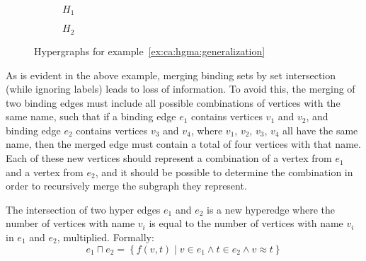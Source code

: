 \documentclass[../Master.tex]{subfiles}
\providecommand{\master}{..}
\begin{document}
\begin{example}
    \begin{figure}
        \centering
        \begin{subfigure}[b]{0.4\textwidth}
            \centering
            \resizebox{\linewidth}{!}{}
			\caption{$H_1$}
            \label{fig:ex:ca:hgma:ex:generalization1}
        \end{subfigure}%
        \hfill%
        \begin{subfigure}[b]{0.4\textwidth}
            \centering
            \resizebox{0.8\linewidth}{!}{}
            \caption{$H_2$}
            \label{fig:ex:ca:hgma:ex:generalization2}
        \end{subfigure}
		\caption{Hypergraphs for example~\ref{ex:ca:hgma:generalization}}\label{fig:ex:ca:hgma:ex:generalization}
    \end{figure}

\end{example}

As is evident in the above example, merging binding sets by set intersection (while ignoring labels) leads to loss of information. To avoid this, the merging of two binding edges must include all possible combinations of vertices with the same name, such that if a binding edge $e_1$ contains vertices $v_1$ and $v_2$, and binding edge $e_2$ contains vertices $v_3$ and $v_4$, where $v_1$, $v_2$, $v_3$, $v_4$ all have the same name, then the merged edge must contain a total of four vertices with that name. Each of these new vertices should represent a combination of a vertex from $e_1$ and a vertex from $e_2$, and it should be possible to determine the combination in order to recursively merge the subgraph they represent.

\begin{definition}
    The intersection of two hyper edges $e_1$ and $e_2$ is a new hyperedge where the number of vertices with name $v_i$ is equal to the number of vertices with name $v_i$ in $e_1$ and $e_2$, multiplied. Formally:
    \begin{equation*}
        e_1 \sqcap e_2 = \left\{
            f(v, t) \; | \;
                v \in e_1 \land t \in e_2 \land v \approx t
        \right\}
    \end{equation*}

\end{definition}
\end{document}
